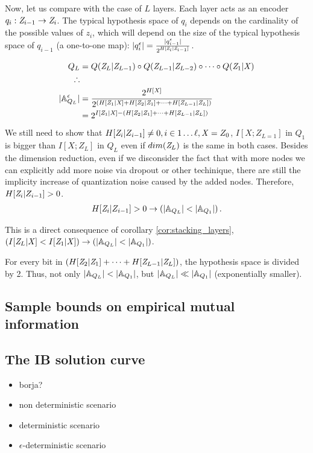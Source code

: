 Now, let us compare with the case of $L$ layers. Each layer acts as an encoder $q_i:{\mathit{Z}}_{i-1} \to {\mathit{Z}}_i$. The typical hypothesis space of $q_i$ depends on the cardinality of the possible values of $z_i$, which will depend on the size of the typical hypothesis space of $q_{i-1}$ (a one-to-one map): $|q_i^\epsilon| = \frac{|q_{i-1}^\epsilon|}{2^{H[{\mathit{Z}}_i|{\mathit{Z}}_{i-1}]}}$.

\begin{align}
	Q_{L} &= Q({\mathit{Z}}_{L} |{\mathit{Z}}_{L-1}) \circ Q({\mathit{Z}}_{L -1}|{\mathit{Z}}_{L-2}) \circ \cdots \circ Q({\mathit{Z}}_1|{\mathit{X}})\\
	\therefore \\
	|{\mathbb{A}}_{Q_L}^\epsilon |&= \frac{2^{H[{\mathit{X}}]}}{2^{(H[{\mathit{Z}}_1|{\mathit{X}}]+H[{\mathit{Z}}_2|{\mathit{Z}}_1]+\cdots + H[{\mathit{Z}}_{L-1}|{\mathit{Z}}_L])}}\\
	&= 2^{I[{\mathit{Z}}_1|{\mathit{X}}]-(H[{\mathit{Z}}_2|{\mathit{Z}}_1]+\cdots + H[{\mathit{Z}}_{L-1}|{\mathit{Z}}_L])}
\end{align}
We still need to show that $H[{\mathit{Z}}_i|Z_{i-1}] \neq 0, i\in{1 \ldots \ell}, {\mathit{X}} = Z_0$, \ie $I[X;Z_{L=1}]$ in $Q_1$ is bigger than $I[X;Z_L]$ in $Q_L$ even if $dim({\mathit{Z}}_L)$ is the same in both cases. Besides the dimension reduction, even if we disconsider the fact that with more nodes we can explicitly add more noise via dropout or other techinique, there are still the implicity increase of quantization noise caused by the added nodes. Therefore, $H[{\mathit{Z}}_i|Z_{i-1}] >0$.
\begin{align}
	H[{\mathit{Z}}_i|Z_{i-1}] >0 \to \left(|{\mathbb{A}}_{Q_L}| < |{\mathbb{A}}_{Q_1}| \right).
\end{align}

This is a direct consequence of corollary \ref{cor:stacking_layers}, $\left( I[{\mathit{Z}}_L|{\mathit{X}}]<I[{\mathit{Z}}_1|{\mathit{X}}] \right) \to \left(|{\mathbb{A}}_{Q_L}| < |{\mathbb{A}}_{Q_1}| \right)$.


For every bit in $(H[{\mathit{Z}}_2|{\mathit{Z}}_1]+\cdots + H[{\mathit{Z}}_{L-1}|{\mathit{Z}}_L])$, the hypothesis space is divided by 2. Thus, not only $|{\mathbb{A}}_{Q_L}| < |{\mathbb{A}}_{Q_1}|$, but $|{\mathbb{A}}_{Q_L}| \ll |{\mathbb{A}}_{Q_1}|$ (exponentially smaller).

\subsection{Sample bounds on empirical mutual information}



\subsection{The IB solution curve}
\begin{itemize}
	\item borja?
	\item non deterministic scenario
	\item deterministic scenario
	\item $\epsilon$-deterministic scenario
\end{itemize}
